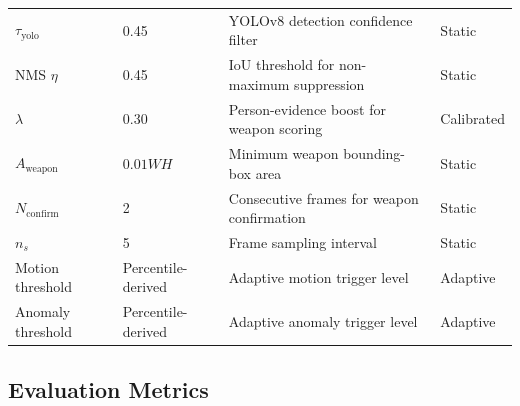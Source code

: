\documentclass[sensors,article,submit,pdftex,moreauthors]{Definitions/mdpi}
\begin{document}
\begin{table}[H]
\begin{tabular}{p{2.8cm} p{1.6cm} p{4.6cm} p{2.0cm}}
$\tau_{\text{yolo}}$                & 0.45          & YOLOv8 detection confidence filter            & Static \\
NMS $\eta$                          & 0.45          & IoU threshold for non-maximum suppression     & Static \\
$\lambda$                           & 0.30          & Person-evidence boost for weapon scoring      & Calibrated \\
$A_{\text{weapon}}$                 & $0.01 WH$     & Minimum weapon bounding-box area              & Static \\
$N_{\text{confirm}}$                & 2             & Consecutive frames for weapon confirmation    & Static \\
$n_s$                               & 5             & Frame sampling interval                       & Static \\
Motion threshold                    & Percentile-derived & Adaptive motion trigger level           & Adaptive \\
Anomaly threshold                   & Percentile-derived & Adaptive anomaly trigger level          & Adaptive \\
\bottomrule
\end{tabular}
\end{table}
 
\subsection{Evaluation Metrics}
\label{sec:metrics}
 
\end{document}
